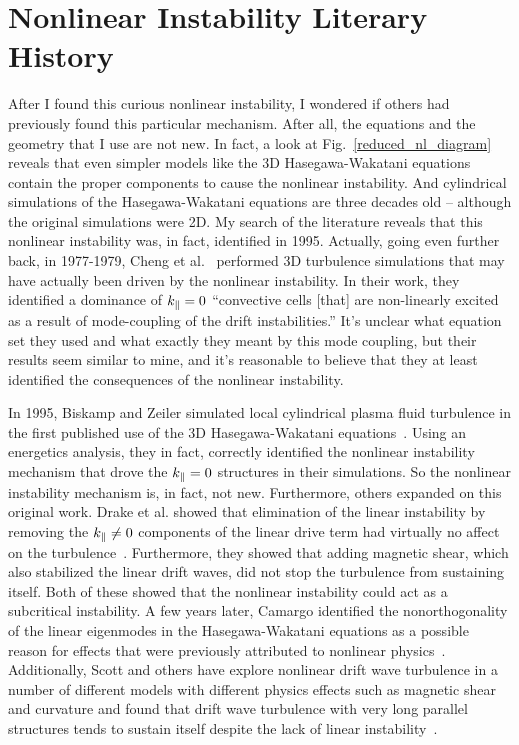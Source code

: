 \section{Nonlinear Instability Literary History}
\label{s_nl_inst_context}

After I found this curious nonlinear instability, I wondered if others had previously found this particular mechanism. 
After all, the equations and the geometry that I use are not new. In fact, a look at 
Fig.~\ref{reduced_nl_diagram} reveals that even simpler models like the 3D Hasegawa-Wakatani equations~\cite{hasegawa1983} contain the proper components to cause the nonlinear instability. And 
cylindrical simulations of the Hasegawa-Wakatani equations are three decades old -- although the original simulations were 2D.
My search of the literature reveals that this nonlinear instability was, in fact, identified in 1995. Actually, going even further back, in 1977-1979, 
Cheng et al.~\cite{cheng1977,cheng1979} performed 3D turbulence simulations that may have actually been driven by the nonlinear instability. 
In their work, they identified a dominance of $k_\parallel=0$ ``convective cells [that] are non-linearly excited as a result of mode-coupling of the drift instabilities.'' 
It's unclear what equation set they used
and what exactly they meant by this mode coupling, but their results seem similar to mine, and it's reasonable to believe that they at least identified the consequences of the nonlinear instability.

In 1995, Biskamp and Zeiler simulated local cylindrical plasma fluid turbulence in the first published use of the 3D Hasegawa-Wakatani equations~\cite{biskamp1995}. 
Using an energetics analysis, they in fact, correctly identified the nonlinear instability mechanism that drove the $k_\parallel=0$ structures in their simulations. So the nonlinear instability
mechanism is, in fact, not new. Furthermore, others expanded on this original work. 
Drake et al. showed that elimination of the linear instability by removing the $k_\parallel \ne 0$ components of the linear drive term
had virtually no affect on the turbulence~\cite{drake1995}. Furthermore, they showed that adding magnetic shear, which also stabilized the linear drift waves, did not stop the turbulence
from sustaining itself. Both of these showed that the nonlinear instability could act as a subcritical instability. A few years later, Camargo identified the nonorthogonality of the linear
eigenmodes in the Hasegawa-Wakatani equations as a possible reason for effects that were previously attributed to nonlinear physics~\cite{camargo1998}.
Additionally, Scott and others have explore nonlinear drift wave turbulence in a number of different models with different physics effects such as magnetic shear and curvature
and found that drift wave turbulence with very long parallel structures tends to sustain itself despite the lack of linear 
instability~\cite{scott1990,scott1992,zeiler1996,zeiler1997,korsholm1999,scott2002,scott2003,scott2005}.

